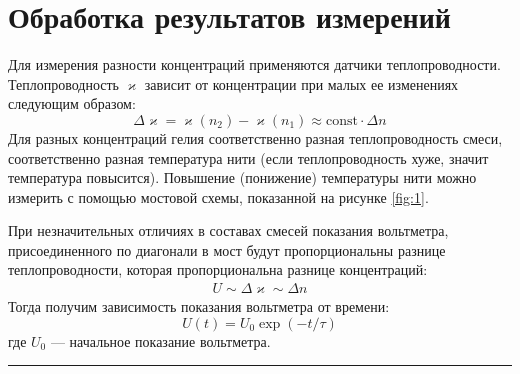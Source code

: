 \documentclass[a4paper,12pt]{report}
\begin{document}
    \section{Обработка результатов измерений}
    \begin{multicols}{2}
        Для измерения разности концентраций применяются датчики теплопроводности. Теплопроводность $\varkappa$ зависит от концентрации при малых ее изменениях следующим образом:
        \begin{equation}
            \Delta\varkappa=\varkappa(n_2)-\varkappa(n_1)\approx\text{const}\cdot\Delta n
        \end{equation}
        Для разных концентраций гелия соответственно разная теплопроводность смеси, соответственно разная температура нити (если теплопроводность хуже, значит температура повысится). Повышение (понижение) температуры нити можно измерить с помощью мостовой схемы, показанной на рисунке \ref{fig:1}.

        При незначительных отличиях в составах смесей показания вольтметра, присоединенного по диагонали в мост будут пропорциональны разнице теплопроводности, которая пропорциональна разнице концентраций:
        \begin{gather*}
            U\sim\Delta\varkappa\sim\Delta n
        \end{gather*}
        Тогда получим зависимость показания вольтметра от времени:
        \begin{equation}
            U(t)=U_0\exp{(-t/\tau)}
        \end{equation}
        где $U_0$ --- начальное показание вольтметра.
    \end{multicols}
    \hrule 
    \newpage
\end{document}
